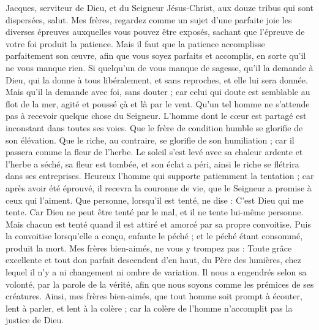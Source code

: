 \begin{multicols}{2}
\TextTitle{[Introduction]}
\VerseOne{}Jacques, serviteur de Dieu, et du Seigneur Jésus-Christ, aux douze tribus qui sont dispersées, salut.
Mes frères, regardez comme un sujet d'une parfaite joie les diverses épreuves auxquelles vous pouvez être exposés,
sachant que l'épreuve de votre foi produit la patience.
Mais il faut que la patience accomplisse parfaitement son œuvre, afin que vous soyez parfaits et accomplis, en sorte qu’il ne vous manque rien.
Si quelqu'un de vous manque de sagesse, qu'il la demande à Dieu, qui la donne à tous libéralement, et sans reproches, et elle lui sera donnée.
Mais qu'il la demande avec foi, sans douter ; car celui qui doute est semblable au flot de la mer, agité et poussé çà et là par le vent.
Qu’un tel homme ne s'attende pas à recevoir quelque chose du Seigneur.
L'homme dont le cœur est partagé est inconstant dans toutes ses voies.
Que le frère de condition humble se glorifie de son élévation.
Que le riche, au contraire, se glorifie de son humiliation ; car il passera comme la fleur de l'herbe.
Le soleil s'est levé avec sa chaleur ardente et l'herbe a séché, sa fleur est tombée, et son éclat a péri, ainsi le riche se flétrira dans ses entreprises.
Heureux l'homme qui supporte patiemment la tentation{} ; car après avoir été éprouvé, il recevra la couronne de vie, que le Seigneur a promise à ceux qui l'aiment.
Que personne, lorsqu’il est tenté, ne dise : C’est Dieu qui me tente. Car Dieu ne peut être tenté par le mal, et il ne tente lui-même personne.
Mais chacun est tenté quand il est attiré et amorcé par sa propre convoitise.
Puis la convoitise lorsqu’elle a conçu, enfante le péché ; et le péché étant consommé, produit la mort.
Mes frères bien-aimés, ne vous y trompez pas :
Toute grâce excellente et tout don parfait descendent d’en haut, du Père des lumières, chez lequel il n'y a ni changement ni ombre de variation.
Il nous a engendrés selon sa volonté, par la parole de la vérité, afin que nous soyons comme les prémices de ses créatures.
Ainsi, mes frères bien-aimés, que tout homme soit prompt à écouter, lent à parler, et lent à la colère ;
car la colère de l'homme n'accomplit pas la justice de Dieu.

\end{multicols}
